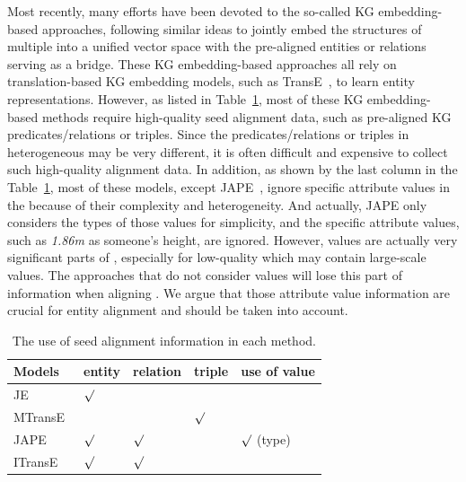 	Most recently, many efforts have been devoted to the so-called KG embedding-based approaches, following similar ideas to jointly embed
the structures of multiple \KGs into a unified vector space with the pre-aligned entities or relations serving as a bridge. These
KG embedding-based approaches all rely on translation-based KG embedding models, such as TransE~\cite{bordes2013translating}, to learn
entity representations. However, as listed in Table~\ref{seed}, most of these KG embedding-based methods require high-quality seed
alignment data, such as pre-aligned KG predicates/relations or triples. Since the predicates/relations or triples in heterogeneous \KGs may
be very different, it is often difficult and expensive to collect such high-quality alignment data. In addition, as shown by the last
column in the Table~\ref{seed}, most of these models, except JAPE~\cite{sun2017cross}, ignore specific attribute values in the \KGs because
of their complexity and heterogeneity. And actually, JAPE only considers the types of those values for simplicity, and the specific
attribute values, such as \textit{1.86m} as someone's height, are ignored. However, values are actually very significant parts of \KGs, especially for low-quality \KGs which may contain large-scale values. The approaches that do not consider values will lose this part of information when aligning \KGs. We argue that those attribute value information are crucial for entity alignment and should be taken into account. 

\begin{table}
	\centering
	\scriptsize
	\begin{tabular}{l|llll}
		\toprule
		\bf Models & \bf entity & \bf relation & \bf triple & \bf use of value \\
		\midrule
		JE~\cite{hao2016joint} & ${\surd}$ & & & \\
		MTransE~\cite{chen2016multilingual} & $ $ & $ $ & ${\surd}$ & \\
		JAPE~\cite{sun2017cross} & ${\surd}$& ${\surd}$& & ${\surd}$ (type)\\
		ITransE~\cite{zhu2017iterative} & ${\surd}$ & ${\surd}$& & \\
		\bottomrule
	\end{tabular}
	\caption{The use of seed alignment information in each method.}
	\label{seed}
\end{table}
	

